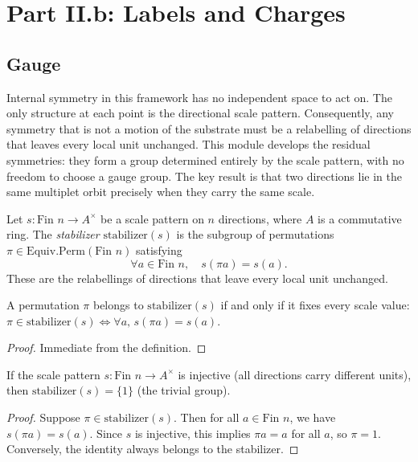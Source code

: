 \section{Part II.b: Labels and Charges}

\subsection{Gauge}

Internal symmetry in this framework has no independent space to act on. The only structure at each point is the directional scale pattern. Consequently, any symmetry that is not a motion of the substrate must be a relabelling of directions that leaves every local unit unchanged. This module develops the residual symmetries: they form a group determined entirely by the scale pattern, with no freedom to choose a gauge group. The key result is that two directions lie in the same multiplet orbit precisely when they carry the same scale.

\begin{definition}
Let $s : \text{Fin } n \to A^\times$ be a scale pattern on $n$ directions, where $A$ is a commutative ring. The \emph{stabilizer} $\mathrm{stabilizer}(s)$ is the subgroup of permutations $\pi \in \mathrm{Equiv.Perm}(\text{Fin } n)$ satisfying
\[ \forall a \in \text{Fin } n, \quad s(\pi a) = s(a). \]
These are the relabellings of directions that leave every local unit unchanged.
\end{definition}

\begin{theorem}
A permutation $\pi$ belongs to $\mathrm{stabilizer}(s)$ if and only if it fixes every scale value: $\pi \in \mathrm{stabilizer}(s) \iff \forall a, \, s(\pi a) = s(a)$.
\end{theorem}

\begin{proof}
Immediate from the definition.
\end{proof}

\begin{theorem}
If the scale pattern $s : \text{Fin } n \to A^\times$ is injective (all directions carry different units), then $\mathrm{stabilizer}(s) = \{1\}$ (the trivial group).
\end{theorem}

\begin{proof}
Suppose $\pi \in \mathrm{stabilizer}(s)$. Then for all $a \in \text{Fin } n$, we have $s(\pi a) = s(a)$. Since $s$ is injective, this implies $\pi a = a$ for all $a$, so $\pi = 1$. Conversely, the identity always belongs to the stabilizer.
\end{proof}

